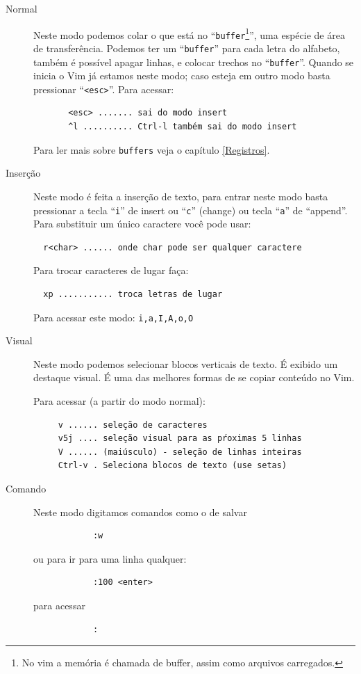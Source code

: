 \documentclass[10pt,a4paper,openany]{book}
\begin{document}
\begin{description}

\item [Normal] Neste modo podemos colar o que está no
 ``\verb|buffer|\footnote{No vim a memória é chamada de buffer, assim como
 arquivos carregados.}'', uma espécie de área de transferência. Podemos ter um
 ``\verb|buffer|'' para cada letra do alfabeto, também é possível apagar linhas, e
 colocar trechos no ``\verb|buffer|''. Quando se inicia o Vim já estamos neste modo;
 caso esteja em outro modo basta pressionar ``\verb|<esc>|''.  Para acessar:

\begin{verbatim}
	   <esc> ....... sai do modo insert
	   ^l .......... Ctrl-l também sai do modo insert
\end{verbatim}

Para ler mais sobre \verb|buffers| veja o capítulo \ref{Registros}.

\item [Inserção]
 Neste modo é feita a inserção de texto, para entrar neste modo
 basta pressionar a tecla ``\verb|i|'' de
 insert ou ``\verb|c|'' (change) ou  tecla ``\verb|a|'' de ``append''.
 Para substituir um único caractere você pode usar:

\begin{verbatim}
  r<char> ...... onde char pode ser qualquer caractere
\end{verbatim}

Para trocar caracteres de lugar faça:

\begin{verbatim}
  xp ........... troca letras de lugar
\end{verbatim}


Para acessar este modo:  \verb+i,a,I,A,o,O+

\item [Visual] Neste modo podemos selecionar blocos verticais de texto. É
exibido um destaque visual. É uma das melhores formas de se copiar
conteúdo no Vim.

Para acessar (a partir do modo normal):

\begin{verbatim}
	 v ...... seleção de caracteres
	 v5j .... seleção visual para as pŕoximas 5 linhas
	 V ...... (maiúsculo) - seleção de linhas inteiras
	 Ctrl-v . Seleciona blocos de texto (use setas)
\end{verbatim}

\item [Comando] Neste modo digitamos comandos como o de salvar

\begin{verbatim}
			:w
\end{verbatim}

ou para ir para uma linha qualquer:

\begin{verbatim}
			:100 <enter>
\end{verbatim}

para acessar
\begin{verbatim}
			:
\end{verbatim}

\end{description}
\end{document}
